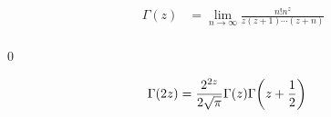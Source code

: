 \documentclass[uplatex,dvipdfmx,a4paper,11pt]{jlreq}
\makeatletter
\theoremstyle{definition}
\renewenvironment{proof}[1][\proofname]{\par
  \normalfont
  \topsep6\p@\@plus6\p@ \trivlist
  \item[\hskip\labelsep{\bfseries #1}\@addpunct{\bfseries}]\ignorespaces\quad\par
}{%
  \qed\endtrivlist\@endpefalse
}
\renewcommand\proofname{証明}
\makeatother
\begin{document}
\begin{proposition}
  \begin{align}
    \Gamma(z) & = \lim_{n\to\infty}\frac{n!n^z}{z(z+1)\cdots(z+n)} \\
  \end{align}
\end{proposition}
\begin{proof}
\end{proof}

\begin{proposition}
  \begin{align}
    \Gamma(2z) & = \frac{2^{2z}}{2\sqrt{\pi}}\Gamma(z)\Gamma\qty(z + \frac{1}{2})
  \end{align}
\end{proposition}
\end{document}
